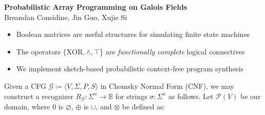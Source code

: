 \documentclass[portrait,a0b,final,a4resizeable]{a0poster}
\def\jointspacing{\vspace{0.3in}}
\begin{document}
  \begin{poster}
    \vspace{1\baselineskip}   %


    \begin{center}
      \begin{pcolumn}{1.03}
        \begin{minipage}[c][9cm][c]{0.85\textwidth}
          \begin{center}
          {\veryHuge \textbf{Probabilistic Array Programming on Galois Fields}}\\[10mm]
          {\huge Breandan Considine, Jin Guo, Xujie Si\\[7.5mm]
          }
          \end{center}
        \end{minipage}
      \end{pcolumn}
    \end{center}

    \vspace*{1.5cm}

    \large



    \Large

    \begin{multicols}{2}



      \vspace*{-1cm}
      \null\hspace*{3cm}\begin{minipage}[c]{0.85\columnwidth}
      \begin{itemize}
        \item Boolean matrices are useful structures for simulating finite state machines
        \item The operators $\{\text{XOR}, \land, \top$\} are \textit{functionally complete} logical connectives
        \item We implement sketch-based probabilistic context-free program synthesis
      \end{itemize}
      \end{minipage}

      \jointspacing

      \null\hspace*{3cm}\begin{minipage}[c]{0.85\columnwidth}
          Given a CFG $\mathcal{G} \coloneqq \langle V, \Sigma, P, S\rangle$ in Chomsky Normal Form (CNF), we may construct a recognizer $R_\mathcal{G}: \Sigma^n \rightarrow \mathbb{B}$ for strings $\sigma: \Sigma^n$ as follows. Let $\mathcal P(V)$ be our domain, where $0$ is $\varnothing$, $\oplus$ is $\cup$, and $\otimes$ be defined as:\\
      \end{minipage}


\end{multicols}
\end{poster}
\end{document}
